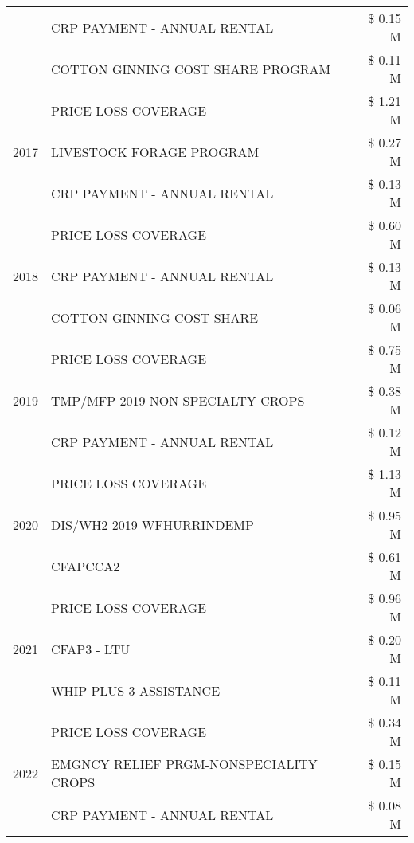 \begin{tabular}{llr}
 & CRP PAYMENT - ANNUAL RENTAL & \$ 0.15 M \\
 & COTTON GINNING COST SHARE PROGRAM & \$ 0.11 M \\
\cline{1-3}
\multirow[t]{3}{*}{2017} & PRICE LOSS COVERAGE & \$ 1.21 M \\
 & LIVESTOCK FORAGE PROGRAM & \$ 0.27 M \\
 & CRP PAYMENT - ANNUAL RENTAL & \$ 0.13 M \\
\cline{1-3}
\multirow[t]{3}{*}{2018} & PRICE LOSS COVERAGE & \$ 0.60 M \\
 & CRP PAYMENT - ANNUAL RENTAL & \$ 0.13 M \\
 & COTTON GINNING COST SHARE & \$ 0.06 M \\
\cline{1-3}
\multirow[t]{3}{*}{2019} & PRICE LOSS COVERAGE & \$ 0.75 M \\
 & TMP/MFP 2019 NON SPECIALTY CROPS & \$ 0.38 M \\
 & CRP PAYMENT - ANNUAL RENTAL & \$ 0.12 M \\
\cline{1-3}
\multirow[t]{3}{*}{2020} & PRICE LOSS COVERAGE & \$ 1.13 M \\
 & DIS/WH2 2019 WFHURRINDEMP & \$ 0.95 M \\
 & CFAPCCA2 & \$ 0.61 M \\
\cline{1-3}
\multirow[t]{3}{*}{2021} & PRICE LOSS COVERAGE & \$ 0.96 M \\
 & CFAP3 - LTU & \$ 0.20 M \\
 & WHIP PLUS 3 ASSISTANCE & \$ 0.11 M \\
\cline{1-3}
\multirow[t]{3}{*}{2022} & PRICE LOSS COVERAGE & \$ 0.34 M \\
 & EMGNCY RELIEF PRGM-NONSPECIALITY CROPS & \$ 0.15 M \\
 & CRP PAYMENT - ANNUAL RENTAL & \$ 0.08 M \\
\cline{1-3}
\bottomrule
\end{tabular}
